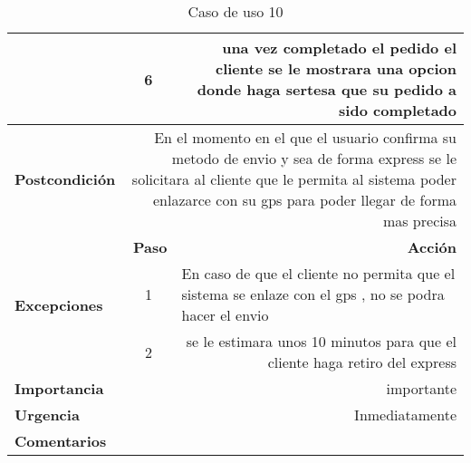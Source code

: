 \documentclass[conference]{IEEEtran}
\begin{document}
\begin{table}[H]
\begin{adjustbox}{width=0.45\textwidth}
\begin{tabular}{|p{11.215em}|r|r|}
\cmidrule{2-3}    \multicolumn{1}{|c|}{} & \multicolumn{1}{c|}{6} & \multicolumn{1}{p{32em}|}{una vez completado el pedido el cliente se le mostrara una opcion donde haga sertesa que su pedido a sido completado } \\
    \midrule
    \textbf{Postcondición} & \multicolumn{2}{p{37.355em}|}{En el momento en el que el usuario confirma su metodo de envio y sea de forma express se le solicitara al cliente que le permita al sistema poder enlazarce con su gps para poder llegar de forma mas precisa} \\
    \midrule
    \multirow{4}[6]{*}{\textbf{Excepciones}} & \multicolumn{1}{p{5.355em}|}{\textbf{Paso}} & \multicolumn{1}{p{32em}|}{\textbf{Acción}} \\
\cmidrule{2-3}    \multicolumn{1}{|c|}{} & \multicolumn{1}{c|}{\multirow{2}[2]{*}{1}} & \multicolumn{1}{l|}{\multirow{2}[2]{*}{En caso de que el cliente no permita que el sistema se enlaze con el gps , no se podra hacer el envio }} \\
    \multicolumn{1}{|c|}{} &       &  \\
\cmidrule{2-3}    \multicolumn{1}{|c|}{} & \multicolumn{1}{c|}{2} & \multicolumn{1}{p{32em}|}{se le estimara unos 10 minutos para que el cliente haga retiro del express } \\
    \midrule
    \textbf{Importancia} & \multicolumn{2}{p{37.355em}|}{importante } \\
    \midrule
    \textbf{Urgencia} & \multicolumn{2}{p{37.355em}|}{Inmediatamente} \\
    \midrule
    \textbf{Comentarios} & \multicolumn{2}{r|}{} \\
    \bottomrule
    \end{tabular}%
    \end{adjustbox}
    \vspace{0.2cm}
    \caption{Caso de uso 10}
  \label{tab:addlabel}%
\end{table}%
\end{document}

